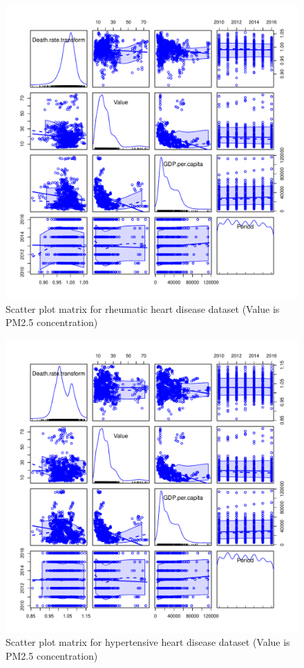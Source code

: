 \documentclass[12pt, letterpaper, twoside]{article}\usepackage[]{graphicx}\usepackage[]{xcolor}
\begin{document}
\begin{figure}[t]
\includegraphics[scale=0.5]{scatterplotmatrix.rheum.pdf}
\centering
\caption{Scatter plot matrix for rheumatic heart disease dataset (Value is PM2.5 concentration)}
\label{fig:Figure 3}
    \vspace{1cm}
\end{figure}

\begin{figure}[t]
\includegraphics[scale=0.5]{scatterplotmatrix.hyper.pdf}
\centering
\caption{Scatter plot matrix for hypertensive heart disease dataset (Value is PM2.5 concentration)}
\label{fig:Figure 4}
    \vspace{1cm}
\end{figure}
\end{document}
